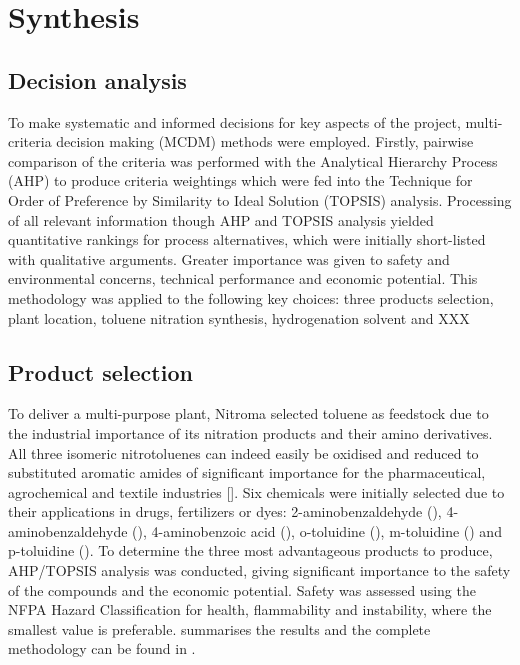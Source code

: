 \section{Synthesis}
\label{sec:synthesis}
\subsection{Decision analysis}
To make systematic and informed decisions for key aspects of the project, multi-criteria decision making (MCDM) methods were employed. Firstly, pairwise comparison of the criteria was performed with the Analytical Hierarchy Process (AHP) to produce criteria weightings which were fed into the Technique for Order of Preference by Similarity to Ideal Solution (TOPSIS) analysis. Processing of all relevant information though AHP and TOPSIS analysis yielded quantitative rankings for process alternatives, which were initially short-listed with qualitative arguments. Greater importance was given to safety and environmental concerns, technical performance and economic potential.
This methodology was applied to the following key choices: three products selection, plant location, toluene nitration synthesis, hydrogenation solvent and XXX 

\subsection{Product selection}
To deliver a multi-purpose plant, Nitroma selected toluene as feedstock due to the industrial importance of its nitration products and their amino derivatives. All three isomeric nitrotoluenes can indeed easily be oxidised and reduced to substituted aromatic amides of significant importance for the pharmaceutical, agrochemical and textile industries []. Six chemicals were initially selected due to their applications in drugs, fertilizers or dyes: 2-aminobenzaldehyde (), 4-aminobenzaldehyde (), 4-aminobenzoic acid (), o-toluidine (), m-toluidine () and p-toluidine (). To determine the three most advantageous products to produce, AHP/TOPSIS analysis was conducted, giving significant importance to the safety of the compounds and the economic potential. Safety was assessed using the NFPA Hazard Classification for health, flammability and instability, where the smallest value is preferable.  summarises the results and the complete methodology can be found in .   


